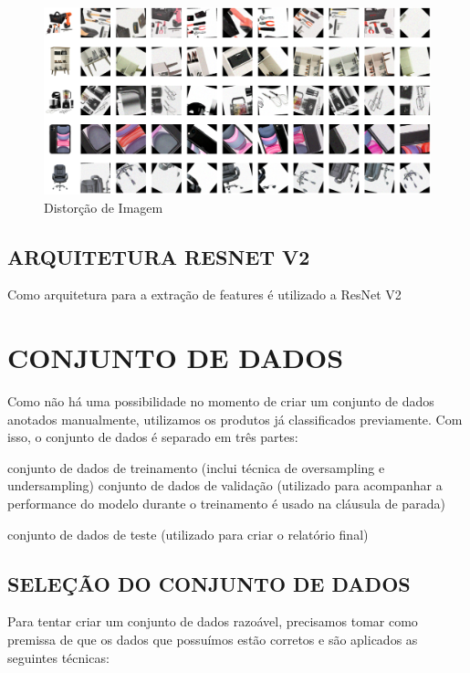 \begin{figure}[htb]
	\caption{\label{imagem_distorcao} Distorção de Imagem}
	\begin{center}
	    \includegraphics[width=\textwidth]{artigo/recursos/imagens/imagem_distorcao.png}
	\end{center}
\end{figure}

\subsection{ARQUITETURA RESNET V2}

Como arquitetura para a extração de features é utilizado a ResNet V2 

\section{CONJUNTO DE DADOS}
Como não há uma possibilidade no momento de criar um conjunto de dados anotados manualmente, utilizamos os produtos já classificados previamente.     Com isso, o conjunto de dados é separado em três partes:

conjunto de dados de treinamento (inclui técnica de oversampling e undersampling)
conjunto de dados de validação (utilizado para acompanhar a performance do modelo durante o treinamento é usado na cláusula de parada)

conjunto de dados de teste (utilizado para criar o relatório final)

\subsection{SELEÇÃO DO CONJUNTO DE DADOS}

Para tentar criar um conjunto de dados razoável, precisamos tomar como premissa de que os dados que possuímos estão corretos e são aplicados as seguintes técnicas:

